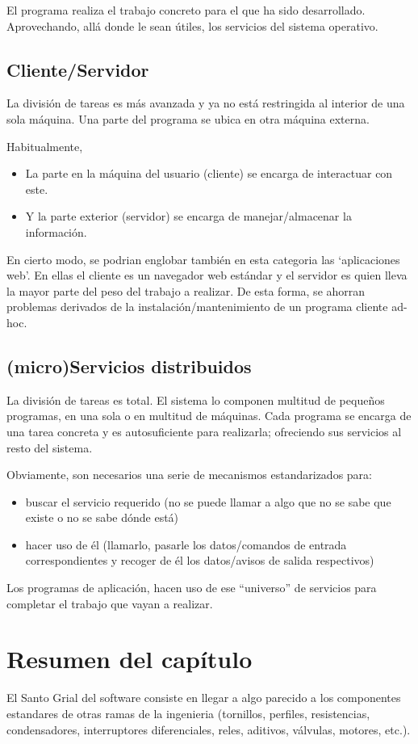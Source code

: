 \documentclass[spanish,12pt,a4paper,final,oneside]{book}
\begin{document}
El programa realiza el trabajo concreto para el que ha sido desarrollado. Aprovechando, allá donde le sean útiles, los servicios del sistema operativo.

\subsection{Cliente/Servidor}
La división de tareas es más avanzada y ya no está restringida al interior de una sola máquina. Una parte del programa se ubica en otra máquina externa.

Habitualmente, 
\begin{itemize}
\item La parte en la máquina del usuario (cliente) se encarga de interactuar con este. 
\item Y la parte exterior (servidor) se encarga de manejar/almacenar la información.
\end{itemize}

En cierto modo, se podrian englobar también en esta categoria las `aplicaciones web'. En ellas el cliente es un navegador web estándar y el servidor es quien lleva la mayor parte del peso del trabajo a realizar. De esta forma, se ahorran problemas derivados de la instalación/mantenimiento de un programa cliente ad-hoc.

\subsection{(micro)Servicios distribuidos}
La división de tareas es total. El sistema lo componen multitud de pequeños programas, en una sola o en multitud de máquinas. Cada programa se encarga de una tarea concreta y es autosuficiente para realizarla; ofreciendo sus servicios al resto del sistema.

Obviamente, son necesarios una serie de mecanismos estandarizados para:
\begin{itemize}
\item buscar el servicio requerido (no se puede llamar a algo que no se sabe que existe o no se sabe dónde está) 
\item hacer uso de él (llamarlo, pasarle los datos/comandos de entrada correspondientes y recoger de él los datos/avisos de salida respectivos)
\end{itemize}

Los programas de aplicación, hacen uso de ese ``universo'' de servicios para completar el trabajo que vayan a realizar.

\section*{Resumen del capítulo}
El Santo Grial del software consiste en llegar a algo parecido a los componentes estandares de otras ramas de la ingenieria (tornillos, perfiles, resistencias, condensadores, interruptores diferenciales, reles, aditivos, válvulas, motores, etc.). 
\end{document}
